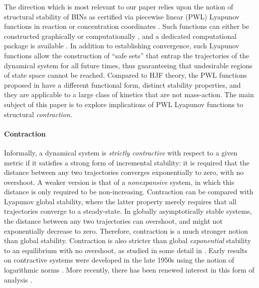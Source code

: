 \documentclass[onefignum,onetabnum]{siamonline220329}
\begin{document}
The direction which is most relevant to our paper relies upon the notion of structural stability of BINs as certified via piecewise linear (PWL) Lyapunov functions in reaction \cite{PWLRj,MA_LEARN} or concentration coordinates \cite{MA_cdc14,blanchini14,MA_LEARN}.   Such functions can either be constructed graphically \cite{PWLRj,blanchini14,MA_LEARN} or computationally \cite{MA_MCSS23}, and a dedicated computational package is available \cite{MA_LEARN}. In addition to establishing convergence, such Lyapunov functions allow the construction of ``safe sets'' that entrap the trajectories of the dynamical system for all future times, thus guaranteeing that undesirable regions of state space cannot be reached.
Compared to HJF theory, the PWL functions proposed in \cite{PWLRj,MA_LEARN} have a different functional form, distinct stability properties, 
and they are applicable to a large class of kinetics that are not mass-action. 
The main subject of this paper is to explore implications of PWL Lyapunov functions %
to structural \emph{contraction}.
 
\paragraph{Contraction} 
  
Informally, a dynamical system is \emph{strictly contractive} with respect to a given metric if it satisfies a strong form of incremental stability: it is required that the  distance between any two trajectories converges exponentially to zero, with no overshoot. A weaker version is that of a \textit{nonexpansive} system, in which this distance is only required to be non-increasing. 
Contraction can be compared with Lyapunov global stability, where the latter property merely requires that all trajectories converge to a steady-state. In globally asymptotically stable systems, the distance between any two trajectories can overshoot, and might not exponentially decrease to zero. Therefore, contraction is a much stronger notion than global stability. Contraction is also stricter than global \textit{exponential} stability to an equilibrium with no overshoot, as studied in some detail in \cite{duvall_sontag_2023_arxiv_ges_contractions}.
Early results on contractive systems were developed in the late 1950s using the notion of logarithmic norms \cite{dahlquist58,lozinskii58}. More recently, there has been renewed interest in this form of analysis \cite{lohmiller98,nijmeijer06,sontag14,forni14,aminzare_sontag_pde2015,davydov22,bullo22}.
\end{document}
